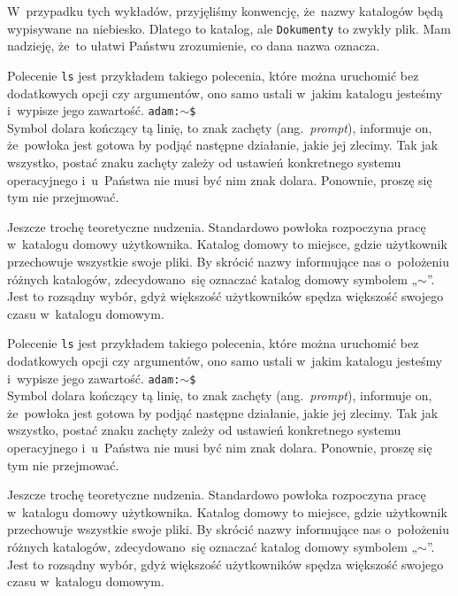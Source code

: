 \documentclass[10pt,t]{beamer}
\begin{document}
\begin{frame}
  W~przypadku tych wykładów, przyjęliśmy konwencję, że~nazwy katalogów
  będą wypisywane na niebiesko. Dlatego \texttt{}
  to katalog, ale \texttt{Dokumenty} to zwykły plik. Mam nadzieję, że~to
  ułatwi Państwu zrozumienie, co dana nazwa oznacza.



  Polecenie \texttt{ls} jest przykładem takiego polecenia, które można
  uruchomić bez dodatkowych opcji czy argumentów, ono samo ustali w~jakim
  katalogu jesteśmy i~wypisze jego zawartość.
  \texttt{adam:$\sim$\$} \\
  Symbol dolara kończący tą linię, to znak zachęty (ang.~\textit{prompt}),
  informuje on, że~powłoka jest gotowa by podjąć następne działanie, jakie
  jej zlecimy. Tak jak wszystko, postać znaku zachęty zależy od ustawień
  konkretnego systemu operacyjnego i~u~Państwa nie musi być nim znak dolara.
  Ponownie, proszę się tym nie przejmować.

  Jeszcze trochę teoretyczne nudzenia. Standardowo powłoka rozpoczyna pracę
  w~katalogu domowy użytkownika. Katalog domowy to miejsce, gdzie użytkownik
  przechowuje wszystkie swoje pliki. By skrócić nazwy informujące nas
  o~położeniu różnych katalogów, zdecydowano~się oznaczać katalog domowy
  symbolem „$\sim$”. Jest to rozsądny wybór, gdyż większość użytkowników
  spędza większość swojego czasu w~katalogu domowym.

  Polecenie \texttt{ls} jest przykładem takiego polecenia, które można
  uruchomić bez dodatkowych opcji czy argumentów, ono samo ustali w~jakim
  katalogu jesteśmy i~wypisze jego zawartość.
  \texttt{adam:$\sim$\$} \\
  Symbol dolara kończący tą linię, to znak zachęty (ang.~\textit{prompt}),
  informuje on, że~powłoka jest gotowa by podjąć następne działanie, jakie
  jej zlecimy. Tak jak wszystko, postać znaku zachęty zależy od ustawień
  konkretnego systemu operacyjnego i~u~Państwa nie musi być nim znak dolara.
  Ponownie, proszę się tym nie przejmować.

  Jeszcze trochę teoretyczne nudzenia. Standardowo powłoka rozpoczyna pracę
  w~katalogu domowy użytkownika. Katalog domowy to miejsce, gdzie użytkownik
  przechowuje wszystkie swoje pliki. By skrócić nazwy informujące nas
  o~położeniu różnych katalogów, zdecydowano~się oznaczać katalog domowy
  symbolem „$\sim$”. Jest to rozsądny wybór, gdyż większość użytkowników
  spędza większość swojego czasu w~katalogu domowym.




\end{frame}
\end{document}
